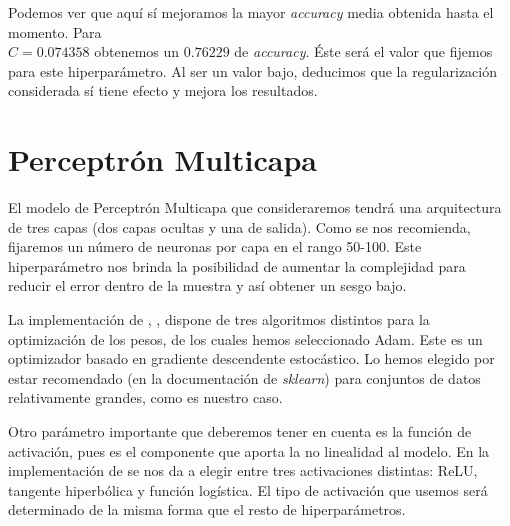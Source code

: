 \documentclass[a4]{article}
\begin{document}
\begin{figure}[H]
    \centering
	\label{fig:log_reg_cv3}
\end{figure}

Podemos ver que aquí sí mejoramos la mayor \textit{accuracy} media obtenida hasta el momento. Para \\$C=0.074358$ obtenemos un $0.76229$ de \textit{accuracy}. Éste será el valor que fijemos para este hiperparámetro.
Al ser un valor bajo, deducimos que la regularización considerada sí tiene efecto y mejora los resultados. 

\section{Perceptrón Multicapa}

El modelo de Perceptrón Multicapa que consideraremos tendrá una arquitectura de tres capas (dos capas ocultas y una de salida). Como se nos recomienda, fijaremos un número de neuronas por capa en el rango 50-100. Este hiperparámetro nos brinda la posibilidad de aumentar la complejidad para reducir el error dentro de la muestra y así obtener un sesgo bajo.

La implementación de , , dispone de tres algoritmos distintos para la optimización de los pesos, de los cuales hemos seleccionado Adam. Este es un optimizador basado en gradiente descendente estocástico. Lo hemos elegido por estar recomendado (en la documentación de \textit{sklearn}) para conjuntos de datos relativamente grandes, como es nuestro caso. 

Otro parámetro importante que deberemos tener en cuenta es la función de activación, pues es el componente que aporta la no linealidad al modelo. En la implementación de  se nos da a elegir entre tres activaciones distintas: ReLU, tangente hiperbólica y función logística. El tipo de activación que usemos será determinado de la misma forma que el resto de hiperparámetros. 
\end{document}
